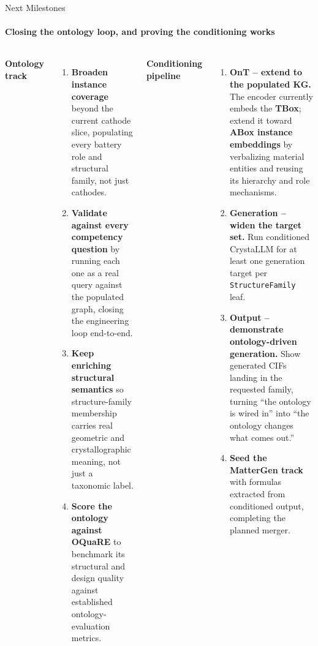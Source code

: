 \documentclass[aspectratio=169, 11pt]{beamer}
\begin{document}
\begin{frame}{Next Milestones}
\framesubtitle{Closing the ontology loop, and proving the conditioning works}
\scriptsize
\begin{columns}[T]
    {\footnotesize \textbf{\textcolor{battCyanLine}{Ontology track}}}
    \vspace{0.2cm}
    \begin{enumerate}\itemsep0.45em
        \item \textbf{Broaden instance coverage} beyond the current cathode slice, populating every battery role and structural family, not just cathodes.
        \item \textbf{Validate against every competency question} by running each one as a real query against the populated graph, closing the engineering loop end-to-end.
        \item \textbf{Keep enriching structural semantics} so structure-family membership carries real geometric and crystallographic meaning, not just a taxonomic label.
        \item \textbf{Score the ontology against OQuaRE} to benchmark its structural and design quality against established ontology-evaluation metrics.
    \end{enumerate}

    {\footnotesize \textbf{\textcolor{amritaMaroon}{Conditioning pipeline}}}
    \vspace{0.2cm}
    \begin{enumerate}\itemsep0.45em
        \item \textbf{OnT -- extend to the populated KG.} The encoder currently embeds the \textbf{TBox}; extend it toward \textbf{ABox instance embeddings} by verbalizing material entities and reusing its hierarchy and role mechanisms.
        \item \textbf{Generation -- widen the target set.} Run conditioned CrystaLLM for at least one generation target per \texttt{StructureFamily} leaf.
        \item \textbf{Output -- demonstrate ontology-driven generation.} Show generated CIFs landing in the requested family, turning ``the ontology is wired in'' into ``the ontology changes what comes out.''
        \item \textbf{Seed the MatterGen track} with formulas extracted from conditioned output, completing the planned merger.
    \end{enumerate}
\end{columns}
\end{frame}
\end{document}
